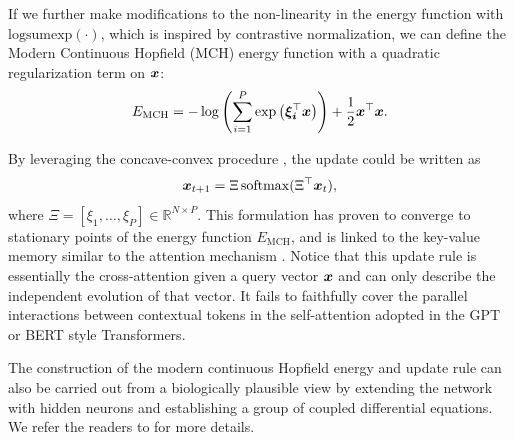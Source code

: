 If we further make modifications to the non-linearity in the energy function with $\operatorname{logsumexp(\cdot)}$, which is inspired by contrastive normalization, we can define the Modern Continuous Hopfield (MCH) energy function with a quadratic regularization term on ${\bm{x}}$:
\begin{equation}
\label{eq:mch}
    E_{\text{MCH}} =  -\log\left(\sum_{i=1}^P \exp\left(\bm{\xi_i}^\top{\bm{x}}\right)\right) + \frac{1}{2}{\bm{x}}^\top{\bm{x}}.
\end{equation}

By leveraging the concave-convex procedure \citep{yuille2003concave}, the update could be written as  
\begin{equation*}
    {\bm{x}}_{t+1} =\Xi\operatorname{softmax}(\Xi^\top{\bm{x}}_t),
\end{equation*}
where $\Xi = [\xi_1, \dots, \xi_P] \in \mathbb{R}^{N\times P}$. This formulation has proven to converge to stationary points of the energy function $E_{\text{MCH}}$, and is linked to the key-value memory similar to the attention mechanism \citep{ramsauer2021hopfield}. 
Notice that this update rule is essentially the cross-attention given a query vector ${\bm{x}}$ and can only describe the independent evolution of that vector. It fails to faithfully cover the parallel interactions between contextual tokens in the self-attention adopted in the GPT or BERT style Transformers. 

The construction of the modern continuous Hopfield energy and update rule can also be carried out from a biologically plausible view by extending the network with hidden neurons and establishing a group of coupled differential equations. We refer the readers to \citet{krotov2021large,krotov2023new} for more details.